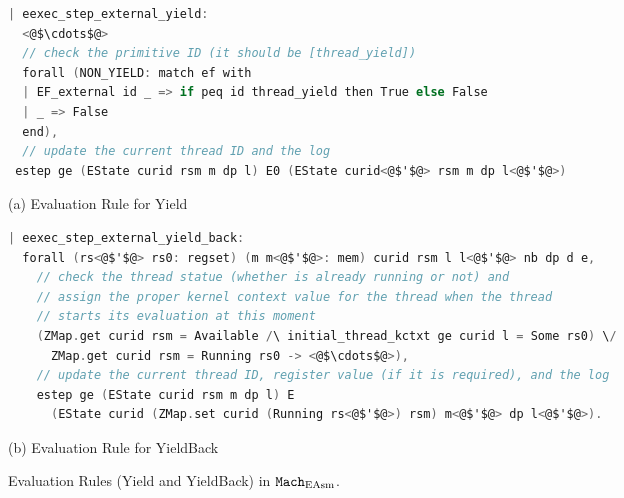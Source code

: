 \begin{figure}
\begin{lstlisting}[language=C]
| eexec_step_external_yield:
  <@$\cdots$@>
  // check the primitive ID (it should be [thread_yield])
  forall (NON_YIELD: match ef with
  | EF_external id _ => if peq id thread_yield then True else False
  | _ => False 
  end),
  // update the current thread ID and the log
 estep ge (EState curid rsm m dp l) E0 (EState curid<@$'$@> rsm m dp l<@$'$@>)
\end{lstlisting}
\begin{center}
(a) Evaluation Rule for Yield
\end{center}
\begin{lstlisting}[language=C]
| eexec_step_external_yield_back:
  forall (rs<@$'$@> rs0: regset) (m m<@$'$@>: mem) curid rsm l l<@$'$@> nb dp d e,
    // check the thread statue (whether is already running or not) and
    // assign the proper kernel context value for the thread when the thread
    // starts its evaluation at this moment
    (ZMap.get curid rsm = Available /\ initial_thread_kctxt ge curid l = Some rs0) \/
      ZMap.get curid rsm = Running rs0 -> <@$\cdots$@>),
    // update the current thread ID, register value (if it is required), and the log
    estep ge (EState curid rsm m dp l) E
      (EState curid (ZMap.set curid (Running rs<@$'$@>) rsm) m<@$'$@> dp l<@$'$@>).
\end{lstlisting}
\begin{center}
(b) Evaluation Rule for YieldBack
\end{center}
\caption{Evaluation Rules (Yield and YieldBack) in ${\mathrm{\texttt{Mach}}}_{\mathrm{EAsm}}$.}
\label{fig:chapter:linking:eval-rule-in-easm-yield}
\end{figure}

%
%
%

